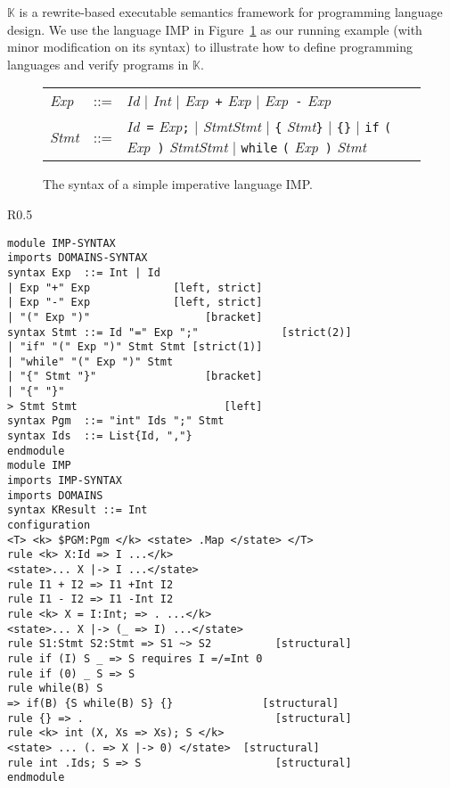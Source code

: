 \documentclass[acmsmall,review,anonymous]{acmart}
\newcommand{\K}{$\mathbb{K}$\xspace}
\newcommand{\Exp}{\textit{Exp}}
\newcommand{\Id}{\textit{Id}}
\newcommand{\Stmt}{\textit{Stmt}}
\begin{document}
\label{sec_k}

\K is a rewrite-based executable semantics framework for programming
language design.
We use the language IMP in Figure~\ref{fig_imp_syntax} as our running example
(with minor modification on its syntax)
to illustrate how to define programming languages and verify programs in \K.

\begin{figure}[btht]
\centering
\begin{tabular}{lcl}
\Exp
&::=&
\Id
$|$
\textit{Int}
$|$
\Exp \ {\tt +} \Exp
$|$
\Exp \ {\tt -} \Exp
\\
\Stmt
&::=&
\Id \ {\tt =} \Exp {\tt ;}
$|$
\Stmt \Stmt
$|$
\verb|{| \Stmt \verb|}|
$|$
\verb|{}|
$|$
{\tt if} {\tt (} \Exp\  {\tt )} \Stmt \Stmt
$|$
{\tt while} {\tt (} \Exp\  {\tt )} \Stmt
\end{tabular}
{The syntax of a simple imperative language IMP.}
\label{fig_imp_syntax}
\end{figure}
\begin{wrapfigure}{R}{0.5\textwidth}
\begin{center}
\begin{minipage}{0.48\textwidth}
\fontsize{7.8}{9.36}\selectfont
\begin{BVerbatim}
module IMP-SYNTAX
imports DOMAINS-SYNTAX
syntax Exp  ::= Int | Id
| Exp "+" Exp             [left, strict]
| Exp "-" Exp             [left, strict]
| "(" Exp ")"                  [bracket]
syntax Stmt ::= Id "=" Exp ";"             [strict(2)]
| "if" "(" Exp ")" Stmt Stmt [strict(1)]
| "while" "(" Exp ")" Stmt
| "{" Stmt "}"                 [bracket]
| "{" "}"
> Stmt Stmt                       [left]
syntax Pgm  ::= "int" Ids ";" Stmt
syntax Ids  ::= List{Id, ","}
endmodule
module IMP
imports IMP-SYNTAX
imports DOMAINS
syntax KResult ::= Int
configuration 
<T> <k> $PGM:Pgm </k> <state> .Map </state> </T>
rule <k> X:Id => I ...</k> 
<state>... X |-> I ...</state>
rule I1 + I2 => I1 +Int I2
rule I1 - I2 => I1 -Int I2
rule <k> X = I:Int; => . ...</k> 
<state>... X |-> (_ => I) ...</state>
rule S1:Stmt S2:Stmt => S1 ~> S2          [structural]
rule if (I) S _ => S requires I =/=Int 0
rule if (0) _ S => S
rule while(B) S 
=> if(B) {S while(B) S} {}              [structural]
rule {} => .                              [structural]
rule <k> int (X, Xs => Xs); S </k> 
<state> ... (. => X |-> 0) </state>  [structural]
rule int .Ids; S => S                     [structural]
endmodule
\end{BVerbatim}
\end{minipage}
\end{center}
\caption{A complete definition for the language IMP}
\label{fig_imp_k}
\end{wrapfigure}
\end{document}
